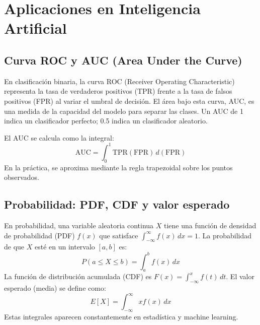 \documentclass[12pt,a4paper,openany,oneside]{book}
\begin{document}
\section{Aplicaciones en Inteligencia Artificial}

\subsection{Curva ROC y AUC (Area Under the Curve)}
En clasificación binaria, la curva ROC (Receiver Operating Characteristic) representa la tasa de verdaderos positivos (TPR) frente a la tasa de falsos positivos (FPR) al variar el umbral de decisión. El área bajo esta curva, AUC, es una medida de la capacidad del modelo para separar las clases. Un AUC de 1 indica un clasificador perfecto; 0.5 indica un clasificador aleatorio.

El AUC se calcula como la integral:
\[
\text{AUC} = \int_{0}^{1} \text{TPR}(\text{FPR}) \, d(\text{FPR})
\]
En la práctica, se aproxima mediante la regla trapezoidal sobre los puntos observados.

\begin{center}
\end{center}

\subsection{Probabilidad: PDF, CDF y valor esperado}
En probabilidad, una variable aleatoria continua $X$ tiene una función de densidad de probabilidad (PDF) $f(x)$ que satisface $\int_{-\infty}^{\infty} f(x) \, dx = 1$. La probabilidad de que $X$ esté en un intervalo $[a,b]$ es:
\[
P(a \le X \le b) = \int_a^b f(x) \, dx
\]
La función de distribución acumulada (CDF) es $F(x) = \int_{-\infty}^x f(t) \, dt$.
El valor esperado (media) se define como:
\[
E[X] = \int_{-\infty}^{\infty} x f(x) \, dx
\]
Estas integrales aparecen constantemente en estadística y machine learning.
\end{document}
